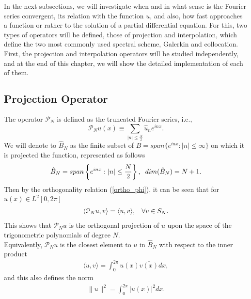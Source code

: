 	In the next subsections, we will investigate when and in what sense is the Fourier series convergent, its relation with the function $u$, and also, how fast approaches a function or rather to the solution of a partial differential equation. For this, two types of operators will be defined, those of projection and interpolation, which define the two most commonly used spectral scheme, Galerkin and collocation. First, the projection and interpolation operators will be studied independently, and at the end of this chapter, we will show the detailed implementation of each of them. \\
	
	\subsection{Projection Operator}
	\vspace{0.2cm}
	The operator $\mathcal{P}_N$ is defined as the truncated Fourier series, i.e.,
	\begin{equation}
	\label{proyection_operator}
		\mathcal{P}_N u(x) \equiv  \displaystyle \sum_{ |n| \leq \frac {N}{2}} \hat{u}_{n} e^{inx}.
	\end{equation}	
	We will denote to $\hat{B}_N$ as the finite subset of $B = span\{e^{inx}: |n| \leq \infty \}$ on which it is projected the function, represented as follows
	\begin{align*}
		\hat{B}_{N} = span \left\{e^{inx}: |n| \leq \frac {N}{2} \right\},\hspace{0.2cm} dim(\hat{B}_{N}) = N + 1.
	\end{align*}
	Then by the orthogonality relation (\ref{ortho_phi}), it can be seen that for $u(x) \in L^2 [0, 2\pi]$
	\begin{align*}
		\langle \mathcal{P}_N u, v \rangle = \langle u, v \rangle, \hspace{3mm} \forall v \in S_N.
	\end{align*}
	This shows that $\mathcal{P}_N u$ is the orthogonal projection of $u$ upon the space of the trigonometric polynomials of degree $N$.\\
	
	Equivalently, $\mathcal{P}_N u$ is the closest element to $u$ in $\hat{B}_N$ with respect to the inner product
	\begin{align*}
		\langle u, v \rangle = \displaystyle \int_{0}^{2 \pi} u(x) \overline{v(x)} dx,
	\end{align*}
	and this also defines the norm
	\begin{align}
	\label{L2_dot}
		\| u \|^2 = \displaystyle \int_{0}^{2 \pi} |u(x)|^2 dx.
	\end{align}
	
